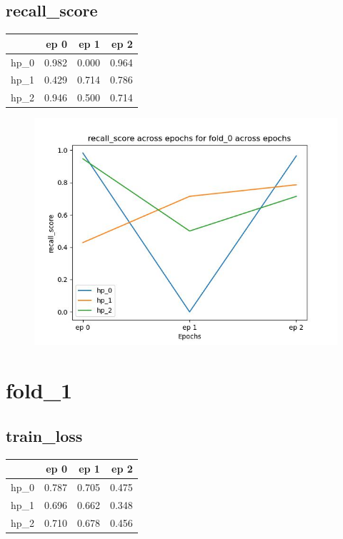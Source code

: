 \documentclass{article}
\begin{document}
\subsection{recall\_score}
\begin{tabular}{lrrr}
\toprule
{} &   ep 0 &   ep 1 &   ep 2 \\
\midrule
hp\_0 &  0.982 &  0.000 &  0.964 \\
hp\_1 &  0.429 &  0.714 &  0.786 \\
hp\_2 &  0.946 &  0.500 &  0.714 \\
\bottomrule
\end{tabular}

\begin{figure}[H]
\includegraphics[scale = 0.75]{fold_0/recall_score}
\end{figure}
\section{fold\_1}
\subsection{train\_loss}
\begin{tabular}{lrrr}
\toprule
{} &   ep 0 &   ep 1 &   ep 2 \\
\midrule
hp\_0 &  0.787 &  0.705 &  0.475 \\
hp\_1 &  0.696 &  0.662 &  0.348 \\
hp\_2 &  0.710 &  0.678 &  0.456 \\
\bottomrule
\end{tabular}
\end{document}

